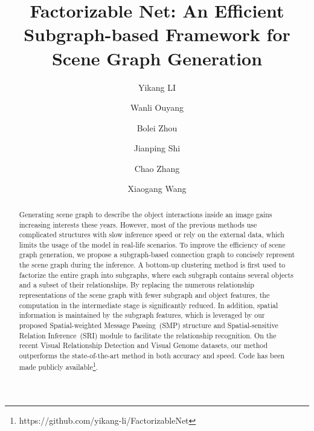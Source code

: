 \documentclass[runningheads]{llncs}
\newcommand{\etal}{\textit{et al}. }
\begin{document}
\title{Factorizable Net: An Efficient Subgraph-based  Framework for Scene Graph Generation} 


\author{Yikang LI \and
Wanli Ouyang \and
Bolei Zhou \and 
Jianping Shi \and 
Chao Zhang \and
Xiaogang Wang}
\authorrunning{Yikang LI \etal}


\maketitle              \begin{abstract}
  Generating scene graph to describe the object interactions inside an image gains increasing interests these years. However, most of the previous methods use complicated structures with slow inference speed or rely on the external data, which limits the usage of the model in real-life scenarios. To improve the efficiency of scene graph generation, we propose a subgraph-based connection graph to concisely represent the scene graph during the inference.  A bottom-up clustering method is first used to factorize the entire graph into subgraphs, where each subgraph contains several objects and a subset of their relationships. By replacing the numerous relationship representations of the scene graph with fewer subgraph and object features, the computation in the intermediate stage is significantly reduced. In addition, spatial information is maintained by the subgraph features, which is leveraged by our proposed 
Spatial-weighted Message Passing~(SMP) structure and Spatial-sensitive Relation Inference~(SRI) module to facilitate the relationship recognition. 
On the recent Visual Relationship Detection and Visual Genome datasets, our method outperforms the state-of-the-art method in both accuracy and speed. Code has been made publicly available\footnote{https://github.com/yikang-li/FactorizableNet}.



\end{abstract}
\end{document}
